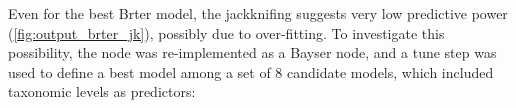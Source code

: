 \documentclass{dragonfly-report}
\begin{document}
Even for the best Brter model, the jackknifing suggests very low predictive power (\autoref{fig:output_brter_jk}), possibly due to over-fitting. To investigate this possibility, the node was re-implemented as a Bayser node, and a tune step was used to define a best model among a set of 8 candidate models, which included taxonomic levels as predictors:

\begin{knitrout}
\color{fgcolor}\begin{kframe}
\begin{alltt}
\hlopt{$}\hlopt{$}  \hlkwb{=} \hlstd{(} \hlopt{~} \hlstd{=}\hlstd{)} \hlopt{+}
                                   \hlstd{=}\hlstd{)} \hlopt{+}
                                    \hlopt{+}
                                    \hlopt{+}
                                    \hlopt{+}
                                    \hlopt{+}
                                    \hlopt{+}
                                   \hlopt{*} \hlopt{+}
                                    \hlopt{+}
                                    

\hlopt{$}\hlopt{$}\hlopt{$}
\end{alltt}



\end{kframe}
\end{knitrout}
\end{document}
